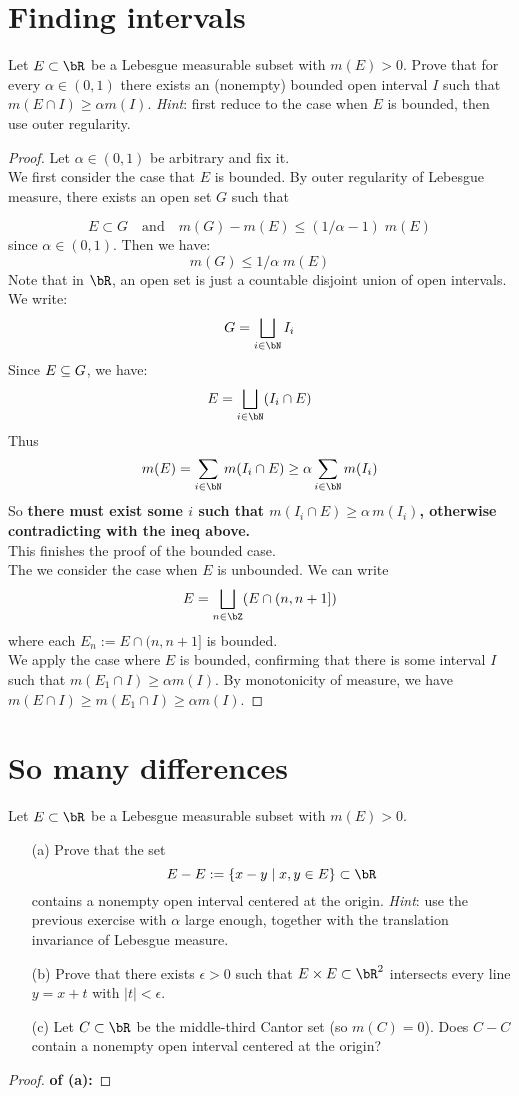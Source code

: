 \documentclass[lang=cn,11pt]{elegantbook}
\begin{document}
\section{Finding intervals}
  Let $E\subset\bR$ be a Lebesgue measurable subset with $m(E)>0$. Prove that for every $\alpha\in(0,1)$ there exists an (nonempty) bounded open interval $I$ such that $m(E\cap I)\ge\alpha m(I)$.
  \textit{Hint}: first reduce to the case when $E$ is bounded, then use outer regularity.
\begin{proof}
Let $\alpha \in (0,1)$ be arbitrary and fix it.\\
We first consider the case that $E$ is bounded. By outer regularity of Lebesgue measure, there exists an open set \( G \) such that

\[
E \subset G \quad \text{and} \quad m(G) - m(E) \leq  (1/\alpha-1) \; m(E)
\]
since $\alpha \in (0,1)$.
Then we have:
$$
m(G) \leq  1 / \alpha \; m(E)
$$
Note that in $\bR$, an open set is just a countable disjoint union of open intervals. We write:
$$
G = \bigsqcup_{i\in \bN} I_i
$$
Since $E \subseteq G$, we have:
$$
E = \bigsqcup_{i\in \bN}  (I_i \cap E)
$$
Thus 
$$
m(E) = \sum_{i\in \bN}  m(I_i \cap E) \geq \alpha \sum_{i\in \bN} m(I_i)
$$
So \textbf{there must exist some $i$ such that $m(I_i \cap E) \geq \alpha \, m(I_i)$, otherwise contradicting with the ineq above.}\\
This finishes the proof of the bounded case.\\
The we consider the case when $E$ is unbounded. 
We can write
\[
E = \bigsqcup_{n\in \bZ} (E \cap (n, n+1]) 
\]
where each $E_n :=E \cap (n, n+1]$ is bounded.\\
We apply the case where $E$ is bounded, confirming that there is some interval $I$ such that $m(E_1\cap I)\ge\alpha m(I)$. By monotonicity of measure, we have $m(E \cap I) \geq m(E_1 \cap I) \geq \alpha m(I)$.
\end{proof}




\section{So many differences}
  Let $E\subset\bR$ be a Lebesgue measurable subset with $m(E)>0$.
  \begin{itemize}
  \item[(a)]
    Prove that the set
    \[
      E-E:=\{x-y\mid x,y\in E\}\subset\bR
    \]
    contains a nonempty open interval centered at the
    origin. \textit{Hint}: use the previous exercise with $\alpha$
    large enough, together with the translation invariance of Lebesgue
    measure.
  \item[(b)]
    Prove that there exists $\epsilon>0$ such that $E\times E\subset\bR^2$ intersects every line $y=x+t$ with $|t|<\epsilon$.
  \item[(c)]
    Let $C\subset\bR$ be the middle-third Cantor set (so $m(C)=0$). Does $C-C$ contain a nonempty open interval centered at the origin?
  \end{itemize}  
\begin{proof}
\textbf{of (a): }
\end{proof}
\end{document}
